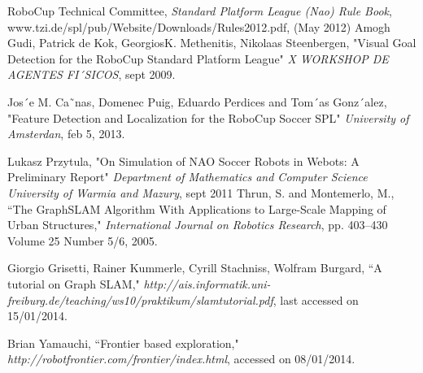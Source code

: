 \documentclass{ba-kecs}
\numberwithin{figure}{section}
\begin{document}
\begin{thebibliography}{99}

 RoboCup Technical Committee, \textit{Standard Platform League (Nao) Rule Book}, www.tzi.de/spl/pub/Website/Downloads/Rules2012.pdf, (May 2012)
 Amogh Gudi, Patrick de Kok, GeorgiosK. Methenitis, Nikolaas Steenbergen, "Visual Goal Detection for the RoboCup Standard Platform League" \emph{X WORKSHOP DE AGENTES FI´SICOS}, sept 2009.

 Jos´e M. Ca˜nas, Domenec Puig, Eduardo Perdices and Tom´as Gonz´alez, "Feature Detection and Localization for the
RoboCup Soccer SPL" \emph{University of Amsterdan}, feb 5, 2013.

 Lukasz Przytula, "On Simulation of NAO Soccer Robots in Webots: A Preliminary Report" \emph{Department of Mathematics and Computer Science University of Warmia and Mazury}, sept 2011
 Thrun, S. and Montemerlo, M., ``The GraphSLAM Algorithm With Applications to Large-Scale Mapping of Urban Structures," \emph{International Journal on Robotics Research}, pp. 403--430 Volume 25 Number 5/6, 2005.

 Giorgio Grisetti, Rainer Kummerle, Cyrill Stachniss, Wolfram Burgard, ``A tutorial on Graph SLAM," \emph{http://ais.informatik.uni-freiburg.de/teaching/ws10/praktikum/slamtutorial.pdf}, last accessed on 15/01/2014.
 
 Brian Yamauchi, ``Frontier based exploration," \emph{http://robotfrontier.com/frontier/index.html}, accessed on 08/01/2014. 



\end{thebibliography}
\end{document}
